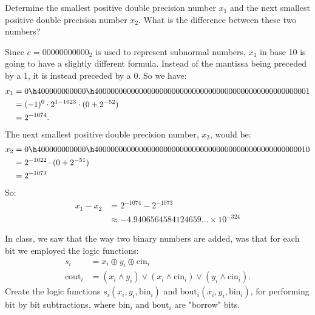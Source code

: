 \documentclass[11pt,twoside,openany]{memoir}
\begin{document}
    \begin{problem}
        Determine the smallest positive double precision number $x_1$ and the next smallest positive double precision number $x_2$. What is the difference between these two numbers?
    \end{problem}
        \begin{solution}
           Since $e = 00000000000_2$ is used to represent subnormal numbers, $x_1$ in base 10 is going to have a slightly different formula. Instead of the mantissa being preceded by a 1, it is instead preceded by a 0. So we have:
                \begin{equation*}
                \begin{split}
                    x_1 &= 0\h4 00000000000 \h4 0000000000000000000000000000000000000000000000000001 \\
                    & = (-1)^0 \cdot 2^{1-1023} \cdot (0 + 2^{-52}) \\
                    & = 2^{-1074}.
                \end{split}
                \end{equation*}
            The next smallest positive double precision number, $x_2$, would be:
                \begin{equation*}
                \begin{split}
                    x_2 & = 
                    0 \h4 00000000000 \h4 0000000000000000000000000000000000000000000000000010 \\
                    & = 2^{-1022}\cdot (0 + 2^{-51}) \\
                    & = 2^{-1073}
                \end{split}
                \end{equation*}
            So:
                \begin{equation*}
                \begin{split}
                    x_1 - x_2 &= 2^{-1074} - 2^{-1073} \\
                    &\approx -4.9406564584124659... \times 10^{-324}
                \end{split}
                \end{equation*}
        \end{solution}
    \begin{problem} 
        In class, we saw that the way two binary numbers are added, was that for each bit we employed the logic functions:
            \begin{equation*}
            \begin{split}
                s_i &= x_i \oplus y_i \oplus \text{cin}_i \\
                \text{cout}_i & = (x_i \land y_i) \lor (x_i \land \text{cin}_i) \lor (y_i \land \text{cin}_i).
            \end{split}
            \end{equation*}
        Create the logic functions $s_i(x_i,y_i,\text{bin}_i)$ and $\text{bout}_i (x_i,y_i,\text{bin}_i)$, for performing bit by bit subtractions, where $\text{bin}_i$ and $\text{bout}_i$ are "borrow" bits.
    \end{problem}
\end{document}
